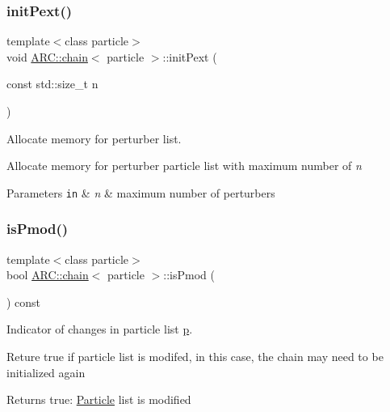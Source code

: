 \subsubsection{\texorpdfstring{init\+Pext()}{initPext()}}
{\footnotesize\ttfamily template$<$class particle$>$ \\
void \hyperlink{classARC_1_1chain}{A\+R\+C\+::chain}$<$ particle $>$\+::init\+Pext (\begin{DoxyParamCaption}\item[{const std\+::size\+\_\+t}]{n }\end{DoxyParamCaption})\hspace{0.3cm}{\ttfamily [inline]}}



Allocate memory for perturber list. 

Allocate memory for perturber particle list with maximum number of {\itshape n} 
\begin{DoxyParams}[1]{Parameters}
\mbox{\tt in}  & {\em n} & maximum number of perturbers \\
\hline
\end{DoxyParams}
\hypertarget{classARC_1_1chain_a9ed7067050141069bc98dccf8f7ab9d0}{}\label{classARC_1_1chain_a9ed7067050141069bc98dccf8f7ab9d0} 
\subsubsection{\texorpdfstring{is\+Pmod()}{isPmod()}}
{\footnotesize\ttfamily template$<$class particle$>$ \\
bool \hyperlink{classARC_1_1chain}{A\+R\+C\+::chain}$<$ particle $>$\+::is\+Pmod (\begin{DoxyParamCaption}{ }\end{DoxyParamCaption}) const\hspace{0.3cm}{\ttfamily [inline]}}



Indicator of changes in particle list \hyperlink{classARC_1_1chain_af1793b656e139e1f87c2e0a55f87514b}{p}. 

Reture true if particle list is modifed, in this case, the chain may need to be initialized again \begin{DoxyReturn}{Returns}
true\+: \hyperlink{classParticle}{Particle} list is modified 
\end{DoxyReturn}
\hypertarget{classARC_1_1chain_afd0342ec9b20a318d811f3ec0f6c9950}{}\label{classARC_1_1chain_afd0342ec9b20a318d811f3ec0f6c9950} 
